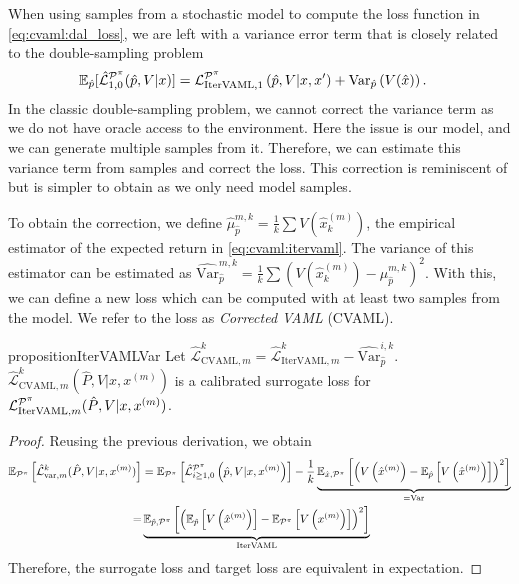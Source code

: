 %
When using samples from a stochastic model to compute the loss function in \autoref{eq:cvaml:dal_loss}, we are left with a variance error term that is closely related to the double-sampling problem
\begin{align}
 &\mathbb{E}_{\hat{p}}[\hat{\mathcal{L}}^{\P^\pi}_{1,0}(\hat{p},V|x)] = {\mathcal{L}}^{\P^\pi}_{\mathrm{IterVAML}, 1}\left(\hat{p},V|x,x'\right) + \mathrm{Var}_{\hat{p}}\left(V(\hat{x})\right).
\end{align}
%
In the classic double-sampling problem, we cannot correct the variance term as we do not have oracle access to the environment.
Here the issue is our model, and we can generate multiple samples from it.
Therefore, we can estimate this variance term from samples and correct the loss.
This correction is reminiscent of \textcite{antos2008learning} but is simpler to obtain as we only need model samples.

To obtain the correction, we define $\hat{\mu}_{\hat{p}}^{m,k} = \frac{1}{k}\sum V(\hat{x}_k^{(m)})$, the empirical estimator of the expected return in \autoref{eq:cvaml:itervaml}.
The variance of this estimator can be estimated as $\widehat{\mathrm{Var}}_{\hat{p}}^{m,k} = \frac{1}{k} \sum (V(\hat{x}_k^{(m)}) - \mu_{\hat{p}}^{m,k})^2$.
With this, we can define a new loss which can be computed with at least two samples from the model.
We refer to the loss as \emph{Corrected VAML} (CVAML).

\begin{restatable}{proposition}{IterVAMLVar}\label{prop:cvaml:2_2}
    Let $\hat{\mathcal{L}}_{\mathrm{CVAML}, m}^{k} = \hat{\mathcal{L}}^k_{\mathrm{IterVAML}, m} - \widehat{\mathrm{Var}}_{\hat{p}}^{i,k}.$
    $\hat{\mathcal{L}}_{\mathrm{CVAML}, m}^{k}(\hat{P}, V|x, x^{(m)})$ is a calibrated surrogate loss for $\mathcal{L}_{\mathrm{IterVAML}, m}^{\P^\pi}(\hat{P}, V|x, x^{(m)})$.
\end{restatable}
\begin{proof}
Reusing the previous derivation, we obtain
\begin{align}
    \EEX{\P^\pi}{\hat{\mathcal{L}}_{\mathrm{var}, m}^{k}(\hat{P}, V|x, x^{(m)})} &= \EEX{\P^\pi}{\hat{\mathcal{L}}^{\P^\pi}_{i\geq1,0}\left(\hat{p},V|x,x^{(m)}\right)} - \frac{1}{k}\underbrace{\EEX{\hat{x},\P^\pi}{\left(V\left(\hat{x}^{(m)}\right) - \EEX{\hat{p}}{V\left(\hat{x}^{(m)}\right)}\right)^2}}_{= \mathrm{Var}}\\
    = & \underbrace{\EEX{\hat{p},\P^\pi}{\left(\EEX{\hat{p}}{V\left(\hat{x}^{(m)}\right)} - \EEX{\P^\pi}{V\left(x^{(m)}\right)}\right)^2}}_{\mathrm{IterVAML}}
\end{align}
Therefore, the surrogate loss and target loss are equivalent in expectation.
\end{proof}



